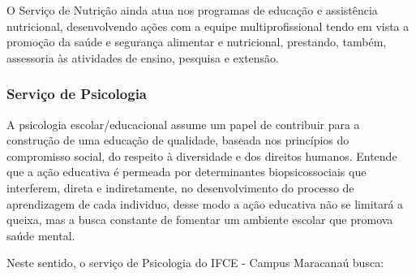 O Serviço de Nutrição ainda atua nos programas de educação e assistência nutricional, desenvolvendo ações com a equipe multiprofissional tendo em vista a promoção da saúde e segurança alimentar e nutricional, prestando, também, assessoria às atividades de ensino, pesquisa e extensão.


\subsubsection{Serviço de Psicologia} 

A psicologia escolar/educacional assume um papel de contribuir para a construção de uma educação de qualidade, baseada nos princípios do compromisso social, do respeito à diversidade e dos direitos humanos. Entende que a ação educativa é permeada por determinantes biopsicossociais que interferem, direta e indiretamente, no desenvolvimento do processo de aprendizagem de cada individuo, desse modo a ação educativa não se limitará a queixa, mas a busca constante de fomentar um ambiente escolar que promova saúde mental.

Neste sentido, o serviço de Psicologia do IFCE - Campus Maracanaú busca:

